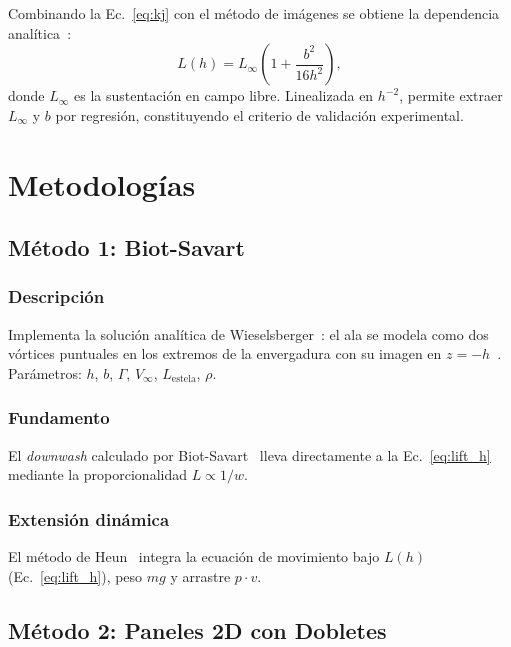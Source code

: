 \documentclass[twocolumn]{article}
\begin{document}
Combinando la Ec.~\eqref{eq:kj} con el método de imágenes se obtiene la dependencia analítica~\cite{wieselsberger1922}:
\begin{equation}
    L(h) = L_{\infty} \left( 1 + \frac{b^2}{16h^2} \right),
    \label{eq:lift_h}
\end{equation}
donde $L_\infty$ es la sustentación en campo libre. Linealizada en $h^{-2}$, permite extraer $L_\infty$ y $b$ por regresión, constituyendo el criterio de validación experimental.

\section{Metodologías}

\subsection{Método 1: Biot-Savart}

\subsubsection{Descripción}

Implementa la solución analítica de Wieselsberger~\cite{wieselsberger1922}: el ala se modela como dos vórtices puntuales en los extremos de la envergadura con su imagen en $z=-h$~\cite{katz2001}. Parámetros: $h$, $b$, $\Gamma$, $V_\infty$, $L_{\text{estela}}$, $\rho$.

\subsubsection{Fundamento}

El \textit{downwash} calculado por Biot-Savart~\cite{prandtl1921} lleva directamente a la Ec.~\eqref{eq:lift_h} mediante la proporcionalidad $L \propto 1/w$.

\subsubsection{Extensión dinámica}

El método de Heun~\cite{burden2015} integra la ecuación de movimiento bajo $L(h)$ (Ec.~\eqref{eq:lift_h}), peso $mg$ y arrastre $p \cdot v$.

\subsection{Método 2: Paneles 2D con Dobletes}
\end{document}
